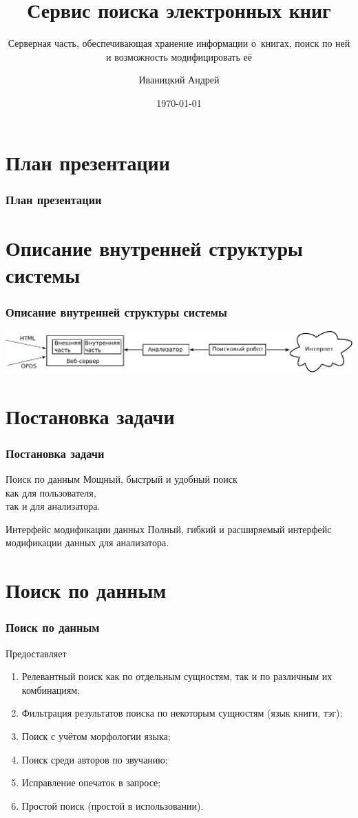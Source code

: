 \documentclass[utf8,handout]{beamer}
\title{Сервис поиска электронных книг}
\subtitle{Серверная часть, обеспечивающая хранение информации о~книгах, поиск по ней и возможность модифицировать её}
\author{Иваницкий Андрей}
\institute{Санкт-Петербургский Академический Университет РАН}
\date{\today}
\begin{document}
\begin{frame}
	\titlepage
\end{frame}

\section*{План презентации}
	\begin{frame}
		\frametitle{План презентации}
		\tableofcontents[pausesections]
	\end{frame}

\section{Описание внутренней структуры системы}
	\begin{frame}
		\frametitle{Описание внутренней структуры системы}
		\includegraphics[width=1.05\textwidth]{./head/innerstructure}
	\end{frame}


\section{Постановка задачи}
	\begin{frame}
		\frametitle{Постановка задачи}
		\begin{block}{Поиск по данным}
			Мощный, быстрый и удобный поиск\\
			как для пользователя,\\
			так и для анализатора.
		\end{block}
		\begin{block}{Интерфейс модификации данных}
			Полный, гибкий и расширяемый интерфейс модификации данных для анализатора.
		\end{block}
	\end{frame}


\section{Поиск по данным}
	\begin{frame}
 		\frametitle{Поиск по данным}
 		\begin{block}{}
			Предоставляет
			\begin{enumerate}
				\item  Релевантный поиск как по отдельным сущностям, так и по различным их комбинациям;
				\item  Фильтрация результатов поиска по некоторым сущностям (язык книги, тэг);
				\item  Поиск с учётом морфологии языка;
				\item  Поиск среди авторов по звучанию;
				\item  Исправление опечаток в запросе;
				\item  Простой поиск (простой в использовании).
			\end{enumerate}
		\end{block}
	\end{frame}
	
\end{document}
